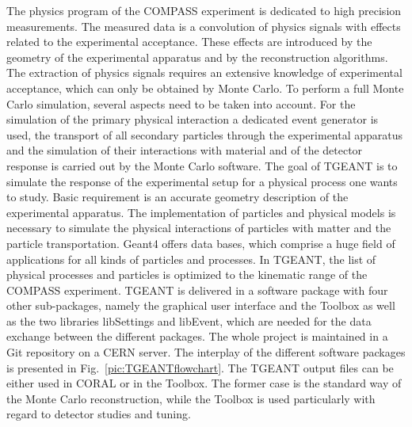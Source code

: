 The physics program of the COMPASS experiment is dedicated to high precision measurements. The measured data is a convolution of physics signals with effects related to the experimental acceptance. These effects are introduced by the geometry of the experimental apparatus and by the reconstruction algorithms. The extraction of physics signals requires an extensive knowledge of experimental acceptance, which can only be obtained by Monte Carlo.
To perform a full Monte Carlo simulation, several aspects need to be taken into account. For the simulation of the primary physical interaction a dedicated event generator is used, the transport of all secondary particles through the experimental apparatus and the simulation of their interactions with material and of the detector response is carried out by the Monte Carlo software.
The goal of TGEANT is to simulate the response of the experimental setup for a physical process one wants to study. Basic requirement is an accurate geometry description of the experimental apparatus. The implementation of particles and physical models is necessary to simulate the physical interactions of particles with matter and the particle transportation. Geant4 offers data bases, which comprise a huge field of applications for all kinds of particles and processes. In TGEANT, the list of physical processes and particles is optimized to the kinematic range of the COMPASS experiment.
TGEANT is delivered in a software package with four other sub-packages, namely the graphical user interface and the Toolbox as well as the two libraries libSettings and libEvent, which are needed for the data exchange between the different packages. The whole project is maintained in a Git repository on a CERN server. The interplay of the different software packages is presented in Fig.~\ref{pic:TGEANTflowchart}. The TGEANT output files can be either used in CORAL or in the Toolbox. The former case is the standard way of the Monte Carlo reconstruction, while the Toolbox is used particularly with regard to detector studies and tuning.

